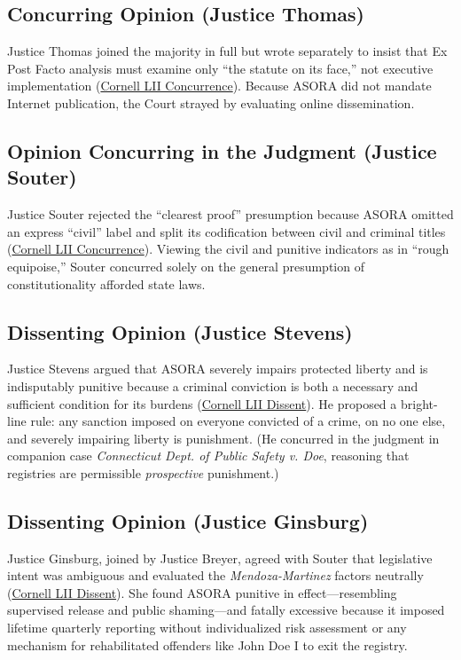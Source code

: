 \documentclass[12pt]{article}
\begin{document}
\subsection{Concurring Opinion (Justice Thomas)}

Justice Thomas joined the majority in full but wrote separately to insist that Ex Post Facto analysis must examine only ``the statute on its face,'' not executive implementation (\href{https://www.law.cornell.edu/supct/html/01-729.ZC.html}{Cornell LII Concurrence}). Because ASORA did not mandate Internet publication, the Court strayed by evaluating online dissemination.

\subsection{Opinion Concurring in the Judgment (Justice Souter)}

Justice Souter rejected the ``clearest proof'' presumption because ASORA omitted an express ``civil'' label and split its codification between civil and criminal titles (\href{https://www.law.cornell.edu/supct/html/01-729.ZC1.html}{Cornell LII Concurrence}). Viewing the civil and punitive indicators as in ``rough equipoise,'' Souter concurred solely on the general presumption of constitutionality afforded state laws.

\subsection{Dissenting Opinion (Justice Stevens)}

Justice Stevens argued that ASORA severely impairs protected liberty and is indisputably punitive because a criminal conviction is both a necessary and sufficient condition for its burdens (\href{https://www.law.cornell.edu/supct/html/01-729.ZD.html}{Cornell LII Dissent}). He proposed a bright-line rule: any sanction imposed on everyone convicted of a crime, on no one else, and severely impairing liberty is punishment. (He concurred in the judgment in companion case \textit{Connecticut Dept. of Public Safety v. Doe}, reasoning that registries are permissible \textit{prospective} punishment.)

\subsection{Dissenting Opinion (Justice Ginsburg)}

Justice Ginsburg, joined by Justice Breyer, agreed with Souter that legislative intent was ambiguous and evaluated the \textit{Mendoza-Martinez} factors neutrally (\href{https://www.law.cornell.edu/supct/html/01-729.ZD1.html}{Cornell LII Dissent}). She found ASORA punitive in effect---resembling supervised release and public shaming---and fatally excessive because it imposed lifetime quarterly reporting without individualized risk assessment or any mechanism for rehabilitated offenders like John Doe I to exit the registry.
\end{document}
